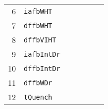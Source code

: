 \begin{table*}[!ht]
\begin{tabular*}{\textwidth}{@{}rlrrrrr@{}}
\footnotesize{6}   & \footnotesize{\texttt{iafbWHT}}    &                        &                                 &&                         &    \\
\footnotesize{7}   & \footnotesize{\texttt{dffbWHT}}    &                        &                                 &&                         &    \\
\footnotesize{8}   & \footnotesize{\texttt{dffbVIHT}}   &                        &                                 &&                         &    \\
\footnotesize{9}   & \footnotesize{\texttt{iafbIntDr}}  &                        &                                 &&                         &    \\
\footnotesize{10}  & \footnotesize{\texttt{dffbIntDr}}  &                        &                                 &&                         &    \\
\footnotesize{11}  & \footnotesize{\texttt{dffbWDr}}    &                        &                                 &&                         &    \\
\footnotesize{12}  & \footnotesize{\texttt{tQuench}}    &                        &                                 &&                         &    \\
\bottomrule
\end{tabular*}
\end{table*}

